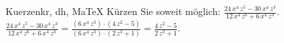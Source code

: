 \begin{MAufgabe}{Kuerzen}{kr, dh, MaTeX}
K\"urzen Sie soweit m\"oglich: $\frac{24\, x^4\, z^5 - 30\, x^4\, z^3}{12\, x^4\, z^6 + 6\, x^4\, z^3}$.\\ 
\ifLsg\MLoesung
\quad $\frac{24\, x^4\, z^5 - 30\, x^4\, z^3}{12\, x^4\, z^6 + 6\, x^4\, z^3}=\frac{(6\, x^4\, z^3)\cdot(4\, z^2 - 5)}{(6\, x^4\, z^3)\cdot(2\, z^3 + 1)}=\frac{4\, z^2 - 5}{2\, z^3 + 1}$.\else\relax\fi
 \end{MAufgabe}